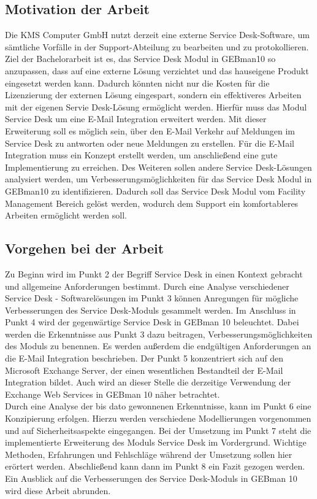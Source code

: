 \subsection{Motivation der Arbeit}
\noindent
Die KMS Computer GmbH nutzt derzeit eine externe Service Desk-Software, um sämtliche Vorfälle in der Support-Abteilung zu bearbeiten und zu protokollieren. Ziel der Bachelorarbeit ist es, das Service Desk Modul in GEBman10 so anzupassen, dass auf eine externe Lösung verzichtet und das hauseigene Produkt eingesetzt werden kann. Dadurch könnten nicht nur die Kosten für die Lizenzierung der externen Lösung eingespart, sondern ein effektiveres Arbeiten mit der eigenen Servie Desk-Lösung ermöglicht werden. Hierfür muss das Modul Service Desk um eine E-Mail Integration erweitert werden. Mit dieser Erweiterung soll es möglich sein, über den E-Mail Verkehr auf Meldungen im Service Desk zu antworten oder neue Meldungen zu erstellen. Für die E-Mail Integration muss ein Konzept erstellt werden, um anschließend eine gute Implementierung zu erreichen.\newline
Des Weiteren sollen andere Service Desk-Lösungen analysiert werden, um Verbesserungsmöglichkeiten für das Service Desk Modul in GEBman10 zu identifizieren. Dadurch soll das Service Desk Modul vom Facility Management Bereich gelöst werden, wodurch dem Support ein komfortableres Arbeiten ermöglicht werden soll.\\


\subsection{Vorgehen bei der Arbeit}
\noindent
Zu Beginn wird im Punkt 2 der Begriff Service Desk in einen Kontext gebracht und allgemeine Anforderungen bestimmt. Durch eine Analyse verschiedener Service Desk - Softwarelösungen im Punkt 3 können Anregungen für mögliche Verbesserungen des Service Desk-Moduls gesammelt werden. Im Anschluss in Punkt 4 wird der gegenwärtige Service Desk in GEBman 10 beleuchtet. Dabei werden die Erkenntnisse aus Punkt 3 dazu beitragen, Verbesserungsmöglichkeiten des Moduls zu benennen. Es werden außerdem die endgültigen Anforderungen an die E-Mail Integration beschrieben. Der Punkt 5 konzentriert sich auf den Microsoft Exchange Server, der einen wesentlichen Bestandteil der E-Mail Integration bildet. Auch wird an dieser Stelle die derzeitige Verwendung der Exchange Web Services in GEBman 10 näher betrachtet.\\

\noindent
Durch eine Analyse der bis dato gewonnenen Erkenntnisse, kann im Punkt 6 eine Konzipierung erfolgen. Hierzu werden verschiedene Modellierungen vorgenommen und auf Sicherheitsaspekte eingegangen. Bei der Umsetzung im Punkt 7 steht die implementierte Erweiterung des Moduls Service Desk im Vordergrund. Wichtige Methoden, Erfahrungen und Fehlschläge während der Umsetzung sollen hier erörtert werden. Abschließend kann dann im Punkt 8 ein Fazit gezogen werden. Ein Ausblick auf die Verbesserungen des Service Desk-Moduls in GEBman 10 wird diese Arbeit abrunden.